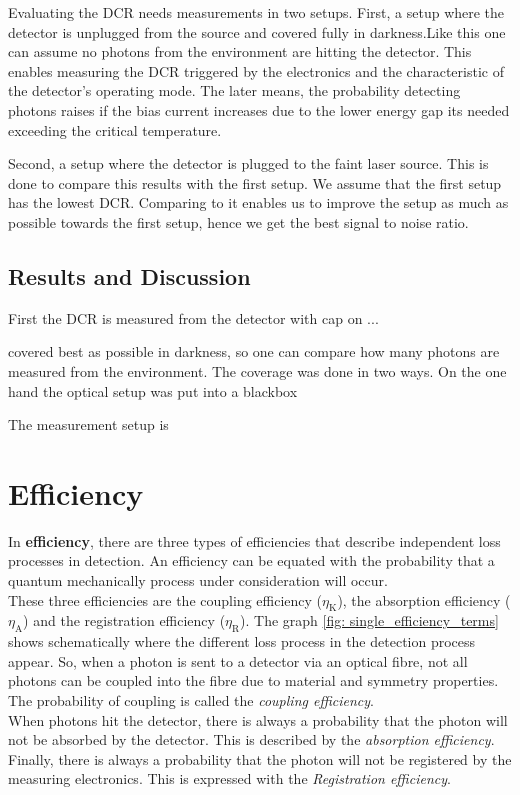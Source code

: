 Evaluating the DCR needs measurements in two setups.
First, a setup where the detector is unplugged from the source and covered fully in darkness.Like this one can assume no
photons from the environment are hitting the detector.
This enables measuring the DCR triggered by the electronics and the characteristic of the detector's operating mode.
The later means, the probability detecting photons raises if the bias current increases due to the lower energy gap
its needed exceeding the critical temperature.

Second, a setup where the detector is plugged to the faint laser source.
This is done to compare this results with the first setup.
We assume that the first setup has the lowest DCR.
Comparing to it enables us to improve the setup as much as possible towards the first setup,
hence we get the best signal to noise ratio.

\subsection*{Results and Discussion}

First the DCR is measured from the detector with cap on ...


covered best as possible in darkness, so one can compare how many photons are measured from the environment. The
coverage was done in two ways. On the one hand the optical setup was put into a blackbox

The measurement setup is

\section{Efficiency}
In \textbf{efficiency}, there are three types of efficiencies that describe independent loss processes in detection.
An efficiency can be equated with the probability that a quantum mechanically process under consideration will occur.\\
These three efficiencies are the coupling efficiency ($\eta_{\text{K}}$),
the absorption efficiency ($\eta_{\text{A}}$) and the registration efficiency ($\eta_{\text{R}}$).
The graph \ref{fig: single_efficiency_terms} shows schematically where the different loss process in the detection
process appear. So, when a photon is sent to a detector via an optical fibre, not all photons can be coupled into the
fibre due to material and symmetry properties.
The probability of coupling is called the \textit{coupling efficiency}. \\
When photons hit the detector, there is always a probability that the photon will not be absorbed by the detector.
This is described by the \textit{absorption efficiency}. \\
Finally, there is always a probability that the photon will not be registered by the measuring electronics.
This is expressed with the \textit{Registration efficiency}. \\

